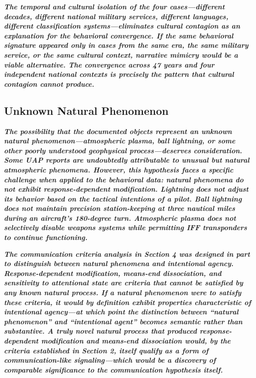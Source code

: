 \documentclass[11pt,letterpaper]{article}
\begin{document}
\textbf{\textit{The temporal and cultural isolation of the four cases---different decades, different national military services, different languages, different classification systems---eliminates cultural contagion as an explanation for the behavioral convergence. If the same behavioral signature appeared only in cases from the same era, the same military service, or the same cultural context, narrative mimicry would be a viable alternative. The convergence across 47 years and four independent national contexts is precisely the pattern that cultural contagion cannot produce.}}


\subsection{Unknown Natural Phenomenon}

\textbf{\textit{The possibility that the documented objects represent an unknown natural phenomenon---atmospheric plasma, ball lightning, or some other poorly understood geophysical process---deserves consideration. Some UAP reports are undoubtedly attributable to unusual but natural atmospheric phenomena. However, this hypothesis faces a specific challenge when applied to the behavioral data: natural phenomena do not exhibit response-dependent modification. Lightning does not adjust its behavior based on the tactical intentions of a pilot. Ball lightning does not maintain precision station-keeping at three nautical miles during an aircraft's 180-degree turn. Atmospheric plasma does not selectively disable weapons systems while permitting IFF transponders to continue functioning.}}


\textbf{\textit{The communication criteria analysis in Section 4 was designed in part to distinguish between natural phenomena and intentional agency. Response-dependent modification, means-end dissociation, and sensitivity to attentional state are criteria that cannot be satisfied by any known natural process. If a natural phenomenon were to satisfy these criteria, it would by definition exhibit properties characteristic of intentional agency---at which point the distinction between ``natural phenomenon'' and ``intentional agent'' becomes semantic rather than substantive. A truly novel natural process that produced response-dependent modification and means-end dissociation would, by the criteria established in Section 2, itself qualify as a form of communication-like signaling---which would be a discovery of comparable significance to the communication hypothesis itself.}}
\end{document}
